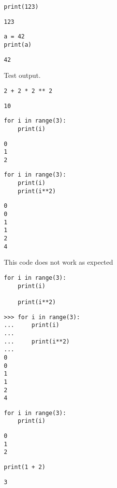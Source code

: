 
\begin{verbatim}
print(123)
\end{verbatim}
\begin{verbatim}
123
\end{verbatim}


\begin{verbatim}
a = 42
print(a)
\end{verbatim}
\begin{verbatim}
42
\end{verbatim}

Test output.

\begin{verbatim}
2 + 2 * 2 ** 2
\end{verbatim}
\begin{verbatim}
10
\end{verbatim}


\begin{verbatim}
for i in range(3):
    print(i)
\end{verbatim}
\begin{verbatim}
0
1
2
\end{verbatim}


\begin{verbatim}
for i in range(3):
    print(i)
    print(i**2)
\end{verbatim}
\begin{verbatim}
0
0
1
1
2
4
\end{verbatim}

This code does not work as expected
\begin{verbatim}
for i in range(3):
    print(i)

    print(i**2)
\end{verbatim}


\begin{verbatim}
>>> for i in range(3):
...     print(i)
...
...     print(i**2)
...
0
0
1
1
2
4

\end{verbatim}


\begin{verbatim}
for i in range(3):
    print(i)
\end{verbatim}
\begin{verbatim}
0
1
2
\end{verbatim}

\begin{verbatim}
print(1 + 2)
\end{verbatim}
\begin{verbatim}
3
\end{verbatim}


